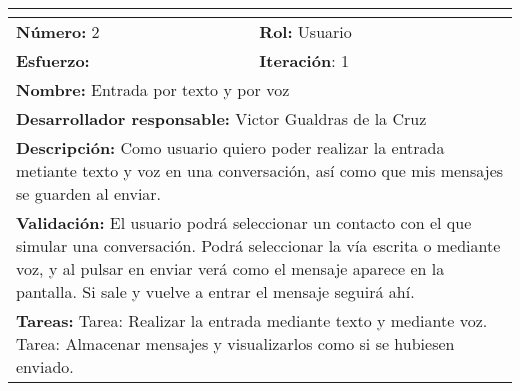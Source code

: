 \begin{tabular}{|p{} |p{} |}
\hline
\multicolumn{2}{|l|}{\cellcolor[HTML]{C0C0C0}{\textbf{Historia de usuario}}} \\ \hline
\textbf{Número:} 2        & \textbf{Rol:} Usuario          \\ \hline
\textbf{Esfuerzo:}           & \textbf{Iteración}: 1       \\ \hline
\multicolumn{2}{|p{0.8\textwidth}|}{\textbf{Nombre:} Entrada por texto y por voz} \\ \hline
\multicolumn{2}{|p{0.8\textwidth}|}{\textbf{Desarrollador responsable:} Victor Gualdras de la Cruz} \\ \hline
\multicolumn{2}{|p{0.8\textwidth}|}{\textbf{Descripción:}\newline
Como usuario quiero poder realizar la entrada metiante texto y voz en una conversación, así como que mis mensajes se guarden al enviar.} \\ \hline
\multicolumn{2}{|p{0.8\textwidth}|}{\textbf{Validación:}\newline
El usuario podrá seleccionar un contacto con el que simular una conversación. Podrá seleccionar la vía escrita o mediante voz, y al pulsar en enviar verá como el mensaje aparece en la pantalla. Si sale y vuelve a entrar el mensaje seguirá ahí.} \\ \hline
\multicolumn{2}{|p{0.8\textwidth}|}{\textbf{Tareas:}\newline
Tarea: Realizar la entrada mediante texto y mediante voz.\newline
Tarea: Almacenar mensajes y visualizarlos como si se hubiesen enviado.
} \\ \hline
\end{tabular}